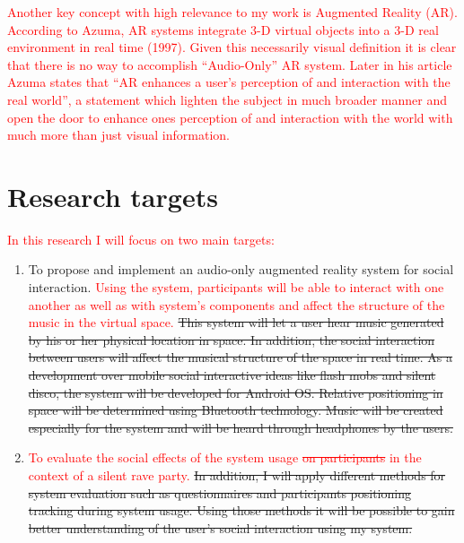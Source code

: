 \documentclass[a4paper,11pt]{article}
\begin{document}
\textcolor{red}{Another key concept with high relevance to my work is Augmented Reality (AR). According to Azuma, AR systems integrate 3-D virtual objects into a 3-D real environment in real time (1997). Given this necessarily visual definition it is clear that there is no way to accomplish ``Audio-Only'' AR system. Later in his article Azuma states that ``AR enhances a user's perception of and interaction with the real world'', a statement which lighten the subject in much broader manner and open the door to enhance ones perception of and interaction with the world with much more than just visual information.}\\


\section{Research targets}

\textcolor{red}{In this research I will focus on two main targets:}

\begin{enumerate}

	\item To propose and implement an audio-only augmented reality system for social interaction. \textcolor{red}{Using the system, participants will be able to interact with one another as well as with system's components and affect the structure of the music in the virtual space.} \st{This system will let a user hear music generated by his or her physical location in space. In addition, the social interaction between users will affect the musical structure of the space in real time. As a development over mobile social interactive ideas like flash mobs and silent disco, the system will be developed for Android OS. Relative positioning in space will be determined using Bluetooth technology. Music will be created especially for the system and will be heard through headphones by the users.}

	\item \textcolor{red}{To evaluate the social effects of the system usage }\textcolor{red}{\st{on participants}}\textcolor{red}{ in the context of a silent rave party. }\st{In addition, I will apply different methods for system evaluation such as questionnaires and participants positioning tracking during system usage. Using those methods it will be possible to gain better understanding of the user's social interaction using my system.}

\end{enumerate}
\end{document}

